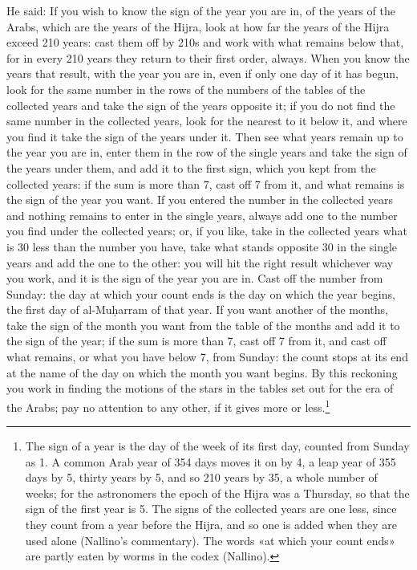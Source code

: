 \documentclass[11pt]{article}
\newcommand{\ArPage}[1]{\marginpar{\footnotesize\color{gray}Ar.\,p.\,#1}}
\begin{document}
\par \ArPage{219}He said: If you wish to know the sign of the year you are in, of the years of the Arabs, which are the years of the Hijra, look at how far the years of the Hijra exceed 210 years: cast them off by 210s and work with what remains below that, for in every 210 years they return to their first order, always. When you know the years that result, with the year you are in, even if only one day of it has begun, look for the same number in the rows of the numbers of the tables of the collected years and take the sign of the years opposite it; if you do not find the same number in the collected years, look for the nearest to it below it, and where you find it take the sign of the years under it. Then see what years remain up to the year you are in, enter them in the row of the single years and take the sign of the years under them, and add it to the first sign, which you kept from the collected years: if the sum is more than 7, cast off 7 from it, and what remains is the sign of the year you want. If you entered the number in the collected years and nothing remains to enter in the single years, always add one to the number you find under the collected years; or, if you like, take in the collected years what is 30 less than the number you have, take what stands opposite 30 in the single years and add the one to the other: you will hit the right result whichever way you work, and it is the sign of the year you are in. Cast off the number from Sunday: the day at which your count ends is the day on which the year begins, the first day of al-Muḥarram of that year. If you want another of the months, take the sign of the month you want from the table of the months and add it to the sign of the year; if the sum is more than 7, cast off 7 from it, and cast off what remains, or what you have below 7, from Sunday: the count stops at its end at the name of the day on which the month you want begins. By this reckoning you work in finding the motions of the stars in the tables set out for the era of the Arabs; pay no attention to any other, if it gives more or less.\footnote{The sign of a year is the day of the week of its first day, counted from Sunday as 1. A common Arab year of 354 days moves it on by 4, a leap year of 355 days by 5, thirty years by 5, and so 210 years by 35, a whole number of weeks; for the astronomers the epoch of the Hijra was a Thursday, so that the sign of the first year is 5. The signs of the collected years are one less, since they count from a year before the Hijra, and so one is added when they are used alone (Nallino's commentary). The words «at which your count ends» are partly eaten by worms in the codex (Nallino).}\par
\end{document}
